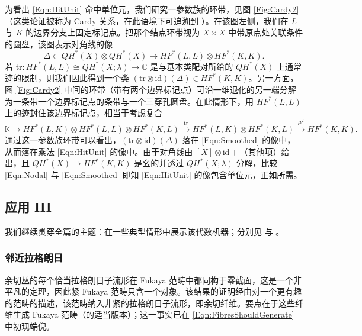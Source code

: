 \documentclass[11pt,a4paper]{article}
\numberwithin{equation}{section}
\newcommand{\bC}{\mathbb{C}}
\newcommand{\bK}{\mathbb{K}}
\newcommand{\tr}{\mathrm{tr}}
\newcommand{\id}{\mathrm{id}}
\begin{document}
为看出 \eqref{Eqn:HitUnit} 命中单位元，我们研究一参数族的环带，见图 \ref{Fig:Cardy2}（这类论证被称为 Cardy 关系，在此语境下可追溯到 \cite{BiranCornea}）。在该图左侧，我们在 $L$ 与 $K$ 的边界分支上固定标记点。把那个结点环带视为 $X\times X$ 中带原点处关联条件的圆盘，该图表示对角线的像
\begin{equation} \label{Eqn:Nodal}
\Delta \subset QH^*(X) \otimes QH^*(X) \longrightarrow HF^*(L,L) \otimes HF^*(K,K).
\end{equation}
若 tr$: HF^*(L,L) \cong QH^*(X;\lambda) \rightarrow \bC$ 是与基本类配对所给的 $QH^*(X)$ 上通常迹的限制，则我们因此得到一个类 $(\tr \otimes \id)(\Delta) \in HF^*(K,K)$。另一方面，图 \ref{Fig:Cardy2} 中间的环带（带有两个边界标记点）可沿一维退化的另一端分解为一条带一个边界标记点的条带与一个三穿孔圆盘。在此情形下，用 $HF^*(L,L)$ 上的迹封住该边界标记点，相当于考虑复合
\begin{equation} \label{Eqn:Smoothed}
\bK \rightarrow HF^*(L,K) \otimes HF^*(L,L) \otimes HF^*(K,L) \stackrel{\mathrm{tr}}{\longrightarrow} HF^*(L,K) \otimes HF^*(K,L) \stackrel{\mu^2}{\longrightarrow}HF^*(K,K). 
\end{equation}
通过这一参数族环带可以看出，$(\tr\otimes \id)(\Delta)$ 落在 \eqref{Eqn:Smoothed} 的像中，从而落在乘法 \eqref{Eqn:HitUnit} 的像中。由于对角线由 $[X]\otimes \id + $（其他项）给出，且 $QH^*(X) \rightarrow HF^*(K,K)$ 是幺的并透过 $QH^*(X;\lambda)$ 分解，比较 \eqref{Eqn:Nodal} 与 \eqref{Eqn:Smoothed} 即知 \eqref{Eqn:HitUnit} 的像包含单位元，正如所需。

\subsection{应用 III}

我们继续贯穿全篇的主题：在一些典型情形中展示该代数机器；分别见 \cite{FSS,Nadler} 与 \cite{AbouzaidSmith:plumbing}。

\subsubsection{邻近拉格朗日\label{Sec:NearbyLag}}

余切丛的每个恰当拉格朗日子流形在 Fukaya 范畴中都同构于零截面，这是一个非平凡的定理，因此紧 Fukaya 范畴只含一个对象。该结果的证明经由对一个更有趣的范畴的描述，该范畴纳入非紧的拉格朗日子流形，即余切纤维。要点在于这些纤维生成 Fukaya 范畴（的适当版本）；这一事实已在 \eqref{Eqn:FibresShouldGenerate} 中初现端倪。
\end{document}
